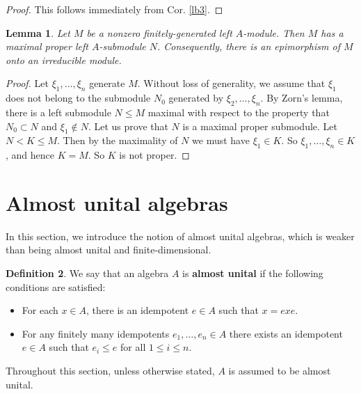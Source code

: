 \documentclass[11pt,b5paper,notitlepage]{article}
\theoremstyle{definition}
\newtheorem{df}{Definition}[section]
\theoremstyle{plain}
\newtheorem{lm}[df]{Lemma}
\newcommand{\QC}{\mathrm{QCoh}_{\mathrm L}}
\newcommand{\Coh}{\mathrm{Coh}_{\mathrm L}}
\numberwithin{equation}{section}
\begin{document}
\begin{proof}
This follows immediately from Cor. \ref{lb3}.
\end{proof}




\begin{lm}\label{lb7}
Let $M$ be a nonzero finitely-generated left $A$-module. Then $M$ has a maximal proper left $A$-submodule $N$. Consequently, there is an epimorphism of $M$ onto an irreducible module.
\end{lm}



\begin{proof}
Let $\xi_1,\dots,\xi_n$ generate $M$. Without loss of generality, we assume that $\xi_1$ does not belong to the submodule $N_0$ generated by $\xi_2,\dots,\xi_n$. By Zorn's lemma, there is a left submodule $N\leq M$ maximal with respect to the property that $N_0\subset N$ and $\xi_1\notin N$. Let us prove that $N$ is a maximal proper submodule. Let $N<K\leq M$. Then by the maximality of $N$ we must have $\xi_1\in K$. So $\xi_1,\dots,\xi_n\in K$, and hence $K=M$. So $K$ is not proper.
\end{proof}








\section{Almost unital algebras}


In this section, we introduce the notion of almost unital algebras, which is weaker than being almost unital and finite-dimensional.


\begin{df}
We say that an algebra $A$ is \textbf{almost unital} if the following conditions are satisfied:
\begin{itemize}
\item[(a)] For each $x\in A$, there is an idempotent $e\in A$ such that $x=exe$.
\item[(b)] For any finitely many idempotents $e_1,\dots,e_n\in A$ there exists an idempotent $e\in A$ such that $e_i\leq e$ for all $1\leq i\leq n$.
\end{itemize}
\end{df}


Throughout this section, unless otherwise stated, $A$ is assumed to be almost unital.
\end{document}
